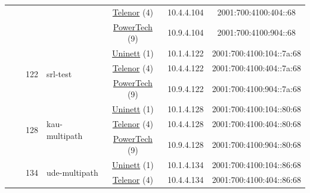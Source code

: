 \begin{small}
\begin{center}
\begin{longtable}{|c|c|c|c|c|c|c|c|}
  &  & \multicolumn{2}{|c|}{} & \multicolumn{2}{|c|}{\tiny{\href{https://www.telenor.no}{Telenor} (4)}} & \tiny{10.4.4.104} & \tiny{2001:700:4100:404::68} \\* \cline{5-5}\cline{6-6}\cline{7-7}\cline{8-8}
  &  & \multicolumn{2}{|c|}{} & \multicolumn{2}{|c|}{\tiny{\href{http://www.powertech.no}{PowerTech} (9)}} & \tiny{10.9.4.104} & \tiny{2001:700:4100:904::68} \\* \cline{3-3}\cline{4-4}\cline{5-5}\cline{6-6}\cline{7-7}\cline{8-8}
  &  & \multirow{3}{*}{\tiny{122}} & \multicolumn{1}{|l|}{\multirow{3}{*}{\tiny{srl-test}}} & \multicolumn{2}{|c|}{\tiny{\href{https://www.uninett.no}{Uninett} (1)}} & \tiny{10.1.4.122} & \tiny{2001:700:4100:104::7a:68} \\* \cline{5-5}\cline{6-6}\cline{7-7}\cline{8-8}
  &  &  &  & \multicolumn{2}{|c|}{\tiny{\href{https://www.telenor.no}{Telenor} (4)}} & \tiny{10.4.4.122} & \tiny{2001:700:4100:404::7a:68} \\* \cline{5-5}\cline{6-6}\cline{7-7}\cline{8-8}
  &  &  &  & \multicolumn{2}{|c|}{\tiny{\href{http://www.powertech.no}{PowerTech} (9)}} & \tiny{10.9.4.122} & \tiny{2001:700:4100:904::7a:68} \\* \cline{3-3}\cline{4-4}\cline{5-5}\cline{6-6}\cline{7-7}\cline{8-8}
  &  & \multirow{3}{*}{\tiny{128}} & \multicolumn{1}{|l|}{\multirow{3}{*}{\tiny{kau-multipath}}} & \multicolumn{2}{|c|}{\tiny{\href{https://www.uninett.no}{Uninett} (1)}} & \tiny{10.1.4.128} & \tiny{2001:700:4100:104::80:68} \\* \cline{5-5}\cline{6-6}\cline{7-7}\cline{8-8}
  &  &  &  & \multicolumn{2}{|c|}{\tiny{\href{https://www.telenor.no}{Telenor} (4)}} & \tiny{10.4.4.128} & \tiny{2001:700:4100:404::80:68} \\* \cline{5-5}\cline{6-6}\cline{7-7}\cline{8-8}
  &  &  &  & \multicolumn{2}{|c|}{\tiny{\href{http://www.powertech.no}{PowerTech} (9)}} & \tiny{10.9.4.128} & \tiny{2001:700:4100:904::80:68} \\* \cline{3-3}\cline{4-4}\cline{5-5}\cline{6-6}\cline{7-7}\cline{8-8}
  &  & \multirow{3}{*}{\tiny{134}} & \multicolumn{1}{|l|}{\multirow{3}{*}{\tiny{ude-multipath}}} & \multicolumn{2}{|c|}{\tiny{\href{https://www.uninett.no}{Uninett} (1)}} & \tiny{10.1.4.134} & \tiny{2001:700:4100:104::86:68} \\* \cline{5-5}\cline{6-6}\cline{7-7}\cline{8-8}
  &  &  &  & \multicolumn{2}{|c|}{\tiny{\href{https://www.telenor.no}{Telenor} (4)}} & \tiny{10.4.4.134} & \tiny{2001:700:4100:404::86:68} \\* \cline{5-5}\cline{6-6}\cline{7-7}\cline{8-8}

\end{longtable}
\end{center}
\end{small}
